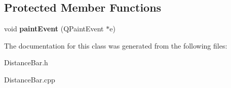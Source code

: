 \subsection*{Protected Member Functions}
\begin{DoxyCompactItemize}
\item 
\hypertarget{classdistance_bar_ad193eaeef68b191b1eab951584efe9af}{void {\bfseries paint\+Event} (Q\+Paint\+Event $\ast$e)}\label{classdistance_bar_ad193eaeef68b191b1eab951584efe9af}

\end{DoxyCompactItemize}


The documentation for this class was generated from the following files\+:\begin{DoxyCompactItemize}
\item 
Distance\+Bar.\+h\item 
Distance\+Bar.\+cpp\end{DoxyCompactItemize}
